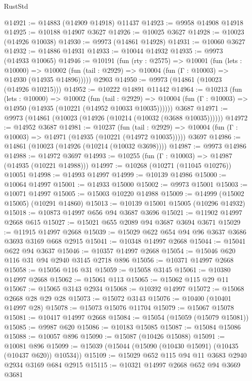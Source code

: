 \begin{lexlean}{RustStd}
\begin{coremodule}
@14921 := @14883 (@14909 @14918) @11437
@14923 := @9958 @14908 @14918
@14925 := @10188 @14907 @3627
@14926 := @10025 @3627
@14928 := @10023 (@14926 @10038)
@14930 := @9973 (@14861 @14928)
@14931 := @10060 @3627
@14932 := @14886 @14931
@14933 := @10044 @14932
@14935 := @9973 (@14933 @10065)
@14946 := @10191
    (fun (rty : @2575) =>
    @10001
      (fun (lets : @10000) =>
      @10002 (fun (tail : @2929) => @10004 (fun (Γ : @10003) => @14930 (@14935 @14896)))))
    @2903
@14950 := @9973 (@14861 (@10023 (@14926 @10215)))
@14952 := @10222 @14891 @11442
@14964 := @10213
    (fun (lets : @10000) =>
    @10002
      (fun (tail : @2929) =>
      @10004 (fun (Γ : @10003) => @14950 (@14935 (@10221 (@14952 @10033 @10035))))))
    @3687
@14971 := @9973 (@14861 (@10023 (@14926 (@10214 (@10032 (@3688 @10035))))))
@14972 := @14952 @3687
@14981 := @10237
    (fun (tail : @2929) => @10004 (fun (Γ : @10003) => @14971 (@14935 (@10221 (@14972 @10035)))))
    @3697
@14986 := @14861 (@10023 (@14926 (@10214 (@10032 @3698))))
@14987 := @9973 @14986
@14988 := @14972 @3697
@14993 := @10255 (fun (Γ : @10003) => @14987 (@14935 (@10221 @14988)))
@14997 := @10268 (@10271 (@11045 @10276)) @10051
@14998 := @14993 @14997
@14999 := @10139 @14986
@15000 := @10064 @14997
@15001 := @14933 @15000
@15002 := @9973 @15001
@15003 := @10071 @14997
@15005 := @15003 @10220 @14988
@15009 := @14999 (@15002 @15005) (@10291 @14860)
@15013 := @10139 @15001 @15005 (@10296 @14932)
@15018 := @10873 @14997 @656 @94 @3687 @3696
@15021 := @11902 @14997 @2668 @615
@15027 := @15021 @655 @2089 @94 @3687 @3694 @3671
@15029 := @11915 @14997 @2668
@15039 := @15029 @622 @654 @94 @96 @3637 @3686 @3693 @3169 @668 @2915
@15041 := @10348 @14997 @2668
@15044 := @15041 @622 @94 @3637
@15046 := @10357 @14997 @2668
@15054 := @15046 @620 @116 @31 @94 @2940 @3145 @2718 @896
@15056 := @10371 @14997 @2668
@15058 := @15056 @116 @31
@15059 := @15058 @3145
@15061 := @10380 @14997 @2668
@15062 := @15061 @113
@15065 := @15062 @115 @29 @11
@15067 := @15065 @3143 @2934
@15068 := @10392 @14997
@15072 := @15068 @2668 @28 @29 @28
@15073 := @15072 @3143
@15076 := @10400 (@10401 @14997 @28)
@15078 := @15073 @15076 @11704
@15079 := @15067 @15078
@15081 := @10417 @14997 @2668
@15084 := @15054 (@15059 (@15079 @15081))
@15085 := @9987 @620
@15086 := @10183 @15085
@15087 := @15084 @15086
@15088 := @10057 @896
@15090 := @15087 (@10426 @15088)
@15091 := @10081 @896
@15099 := @15039 (@15044 (@15090 (@10430 @15091) (@10435 (@10437 @620)) @10534))
@15109 := @15029 @652 @115 @94 @11 @3683 @2940 @2934 @3169 @684 @2915
@15115 := @10321 @14997 @2668 @652 @94 @3669 @3681

\end{coremodule}
\end{lexlean}
